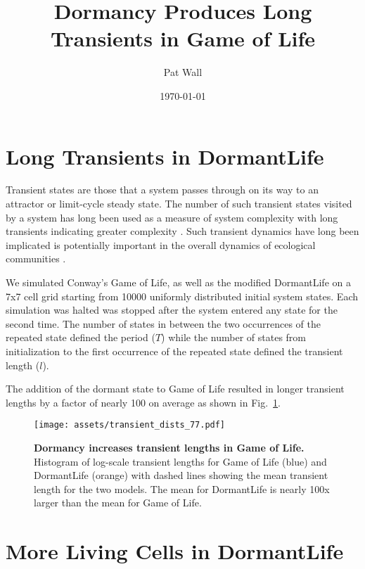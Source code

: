 \documentclass[12pt]{article}
\title{Dormancy Produces Long Transients in Game of Life}
\author{Pat Wall}
\date{\today}
\newcommand{\figref}[1]{Fig.~\ref{fig:#1}}
\begin{document}
\maketitle

\section{Long Transients in DormantLife}

Transient states are those that a system passes through on its way to an
attractor or limit-cycle steady state. The number of such transient states
visited by a system has long been used as a measure of system complexity with
long transients indicating greater complexity
\cite{wolfram_statistical_1983,langton_computation_1990}. Such transient
dynamics have long been implicated is potentially important in the overall
dynamics of ecological communities
\cite{hastings_transient_2018,turchin_complex_1992}.

We simulated Conway's Game of Life, as well as the modified DormantLife
\cite{hutchison_cell_2006} on a 7x7 cell grid starting from 10000 uniformly
distributed initial system states. Each simulation was halted was stopped after
the system entered any state for the second time. The number of states in
between the two occurrences of the repeated state defined the period ($T$) while
the number of states from initialization to the first occurrence of the repeated
state defined the transient length ($l$). 

The addition of the dormant state to Game of Life resulted in longer transient
lengths by a factor of nearly 100 on average as shown in
\figref{transient-hist}.

\begin{figure}
    \centering
    \texttt{[image: assets/transient\_dists\_77.pdf]}
    \caption{\textbf{Dormancy increases transient lengths in Game of Life.}
    Histogram of log-scale transient lengths for Game of Life (blue) and
    DormantLife (orange) with dashed lines showing the mean transient length for
    the two models. The mean for DormantLife is nearly 100x larger than the mean
    for Game of Life.}
    \label{fig:transient-hist}
\end{figure}

\section{More Living Cells in DormantLife}
\end{document}
